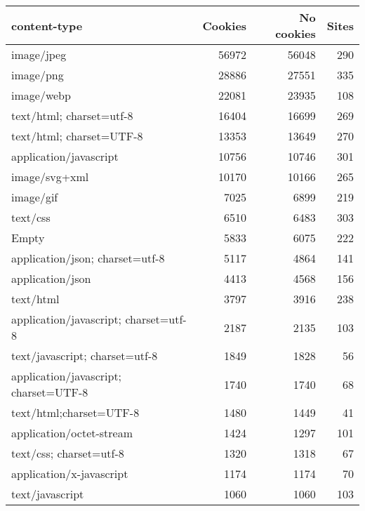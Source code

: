 \begin{tabular}{lrrr}
\toprule
                           content-type &  Cookies &  No cookies &  Sites \\
\midrule
                             image/jpeg &    56972 &       56048 &    290 \\
                              image/png &    28886 &       27551 &    335 \\
                             image/webp &    22081 &       23935 &    108 \\
               text/html; charset=utf-8 &    16404 &       16699 &    269 \\
               text/html; charset=UTF-8 &    13353 &       13649 &    270 \\
                 application/javascript &    10756 &       10746 &    301 \\
                          image/svg+xml &    10170 &       10166 &    265 \\
                              image/gif &     7025 &        6899 &    219 \\
                               text/css &     6510 &        6483 &    303 \\
                                  Empty &     5833 &        6075 &    222 \\
        application/json; charset=utf-8 &     5117 &        4864 &    141 \\
                       application/json &     4413 &        4568 &    156 \\
                              text/html &     3797 &        3916 &    238 \\
  application/javascript; charset=utf-8 &     2187 &        2135 &    103 \\
         text/javascript; charset=utf-8 &     1849 &        1828 &     56 \\
  application/javascript; charset=UTF-8 &     1740 &        1740 &     68 \\
                text/html;charset=UTF-8 &     1480 &        1449 &     41 \\
               application/octet-stream &     1424 &        1297 &    101 \\
                text/css; charset=utf-8 &     1320 &        1318 &     67 \\
               application/x-javascript &     1174 &        1174 &     70 \\
                        text/javascript &     1060 &        1060 &    103 \\

\end{tabular}

